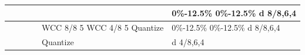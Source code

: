 \begin{tabular}{llllll}
\toprule
 &  &  &  &  & 0\%-12.5\% 0\%-12.5\% d 8/8,6,4 \\
\midrule
 &  &  &  & WCC 8/8 5 WCC 4/8 5 Quantize & 0\%-12.5\% 0\%-12.5\% d 8/8,6,4 \\
 &  &  &  & Quantize & d 4/8,6,4 \\
\bottomrule
\end{tabular}
